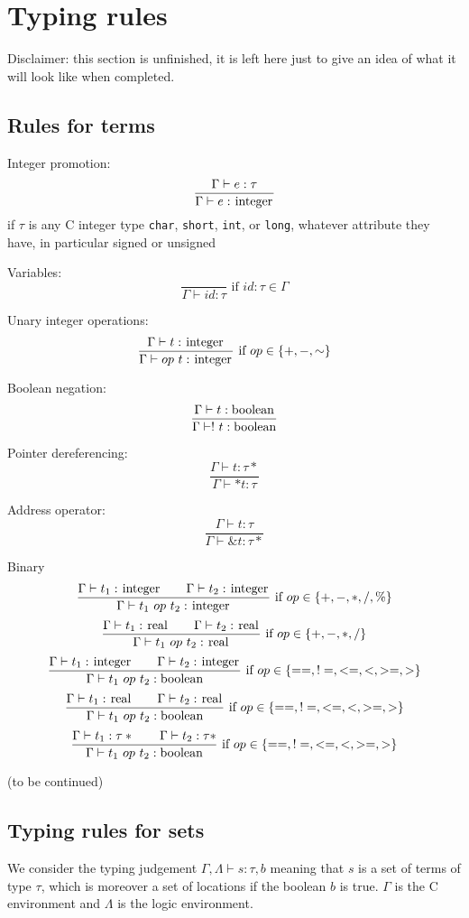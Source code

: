 \section{Typing rules}
\label{sec:typingrules}

Disclaimer: this section is unfinished, it is left here just to give an idea of what it will look like when completed.

\subsection{Rules for terms}

Integer promotion:
\[
\frac{\Gamma \vdash e : \tau}{\Gamma \vdash e : \integer}
\]
if $\tau$ is any C integer type \verb|char|, \verb|short|, \verb|int|, or \verb|long|, whatever attribute they have, in particular signed or unsigned

Variables:
\[
\frac{}{\Gamma \vdash id : \tau} \mbox{ if $id:\tau\in\Gamma$}
\]

Unary integer operations:
\[
\frac{\Gamma \vdash t : \integer}{\Gamma \vdash op~t : \integer} \mbox{ if $op\in \{+,-,\sim\}$}
\]

Boolean negation:
\[
\frac{\Gamma \vdash t : \bool}{\Gamma \vdash !~t : \bool}
\]

Pointer dereferencing:
\[
\frac{\Gamma \vdash t : \tau*}{\Gamma \vdash *t : \tau}
\]

Address operator:
\[
\frac{\Gamma \vdash t : \tau}{\Gamma \vdash \&t : \tau*}
\]

Binary
\[
\frac{\Gamma \vdash t_1 : \integer\qquad\Gamma \vdash t_2 : \integer}{\Gamma \vdash t_1~op~t_2 : \integer} \mbox{ if $op\in \{+,-,*,/,\%\}$}
\]
\[
\frac{\Gamma \vdash t_1 : \real\qquad\Gamma \vdash t_2 : \real}{\Gamma \vdash t_1~op~t_2 : \real} \mbox{ if $op\in \{+,-,*,/\}$}
\]
\[
\frac{\Gamma \vdash t_1 : \integer\qquad\Gamma \vdash t_2 : \integer}{\Gamma \vdash t_1~op~t_2 : \bool} \mbox{ if $op\in \{==,!=,<=,<,>=,>\}$}
\]
\[
\frac{\Gamma \vdash t_1 : \real\qquad\Gamma \vdash t_2 : \real}{\Gamma \vdash t_1~op~t_2 : \bool} \mbox{ if $op\in \{==,!=,<=,<,>=,>\}$}
\]
\[
\frac{\Gamma \vdash t_1 : \tau*\qquad\Gamma \vdash t_2 : \tau*}{\Gamma \vdash t_1~op~t_2 : \bool} \mbox{ if $op\in \{==,!=,<=,<,>=,>\}$}
\]

(to be continued)


\subsection{Typing rules for sets}
We consider the typing judgement $\Gamma,\Lambda \vdash s : \tau,b$
meaning that $s$ is a set of terms of type $\tau$, which is moreover a
set of locations if the boolean $b$ is true.
$\Gamma$ is the C environment and $\Lambda$ is the logic environment.

